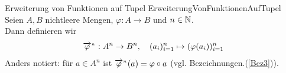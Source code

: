\begin{definition}{Erweiterung von Funktionen auf Tupel}
                  {ErweiterungVonFunktionenAufTupel}
Seien $A, B$ nichtleere Mengen, $\varphi: A \rightarrow B$ und $n \in \mathbb{N}$.\\
Dann definieren wir 
\[{\overrightarrow{\varphi}}^{{}_n}: A^n \rightarrow B^n, \quad
   (a_i)_{i=1}^n \mapsto (\varphi(a_i))_{i=1}^n\]
Anders notiert: für $a \in A^n$ ist ${\overrightarrow{\varphi}}^{{}_n} (a) = \varphi \circ a$
(vgl. Bezeichnungen.(\ref{Bez3})).
\end{definition}